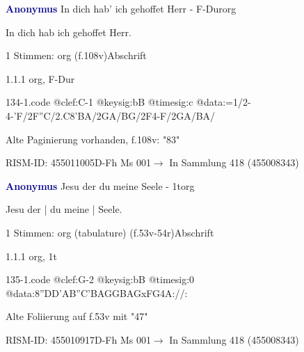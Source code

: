 \documentclass[twocolumn, 12pt]{book}
\begin{document}
\par \vspace{16pt} \textcolor{darkblue}{\textbf{Anonymus  }}\hfillplus{\textbf{[134]}}\newline In dich hab' ich gehoffet Herr - F-Dur\newline org
\par \begin{itshape}[f.108v, heading:] In dich hab ich gehoffet Herr.\end{itshape} 
\par \textcolor{darkblue}{}  1 Stimmen: org  (f.108v)\newline Abschrift
\par 1.1.1  org, F-Dur  
\begin{filecontents*}{134-1.code}
@clef:C-1
@keysig:bB
@timesig:c
@data:=1/2-4-'F/2F''C/2.C{8'BA}/2GA/BG/2F4-F/2GA/BA/
\end{filecontents*}
\newline %
\par Alte Paginierung vorhanden, f.108v: "83"
\par RISM-ID: 455011005\newline D-Fh  Ms 001\newline $\rightarrow$ In Sammlung 418 (455008343)
      
\par \vspace{16pt} \textcolor{darkblue}{\textbf{Anonymus  }}\hfillplus{\textbf{[135]}}\newline Jesu der du meine Seele - 1t\newline org
\par \begin{itshape}[f.53v, at left:] Jesu der | du meine | Seele.\end{itshape} 
\par \textcolor{darkblue}{}  1 Stimmen: org (tabulature)  (f.53v-54r)\newline Abschrift
\par 1.1.1  org, 1t  
\begin{filecontents*}{135-1.code}
@clef:G-2
@keysig:bB
@timesig:0
@data:{8''DD'AB}{''C'BAG}{GBAG}{xFG}4A://:
\end{filecontents*}
\newline %
\par Alte Foliierung auf f.53v mit "47"
\par RISM-ID: 455010917\newline D-Fh  Ms 001\newline $\rightarrow$ In Sammlung 418 (455008343)
      
\end{document}
